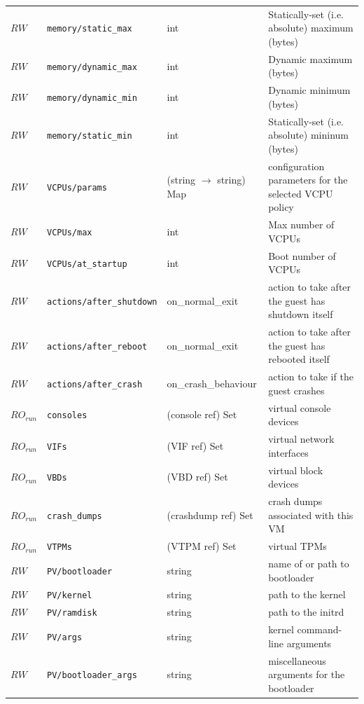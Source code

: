 \begin{longtable}{|lllp{}|}
$\mathit{RW}$ &  {\tt memory/static\_max} & int & Statically-set (i.e. absolute) maximum (bytes) \\
$\mathit{RW}$ &  {\tt memory/dynamic\_max} & int & Dynamic maximum (bytes) \\
$\mathit{RW}$ &  {\tt memory/dynamic\_min} & int & Dynamic minimum (bytes) \\
$\mathit{RW}$ &  {\tt memory/static\_min} & int & Statically-set (i.e. absolute) mininum (bytes) \\
$\mathit{RW}$ &  {\tt VCPUs/params} & (string $\rightarrow$ string) Map & configuration parameters for the selected VCPU policy \\
$\mathit{RW}$ &  {\tt VCPUs/max} & int & Max number of VCPUs \\
$\mathit{RW}$ &  {\tt VCPUs/at\_startup} & int & Boot number of VCPUs \\
$\mathit{RW}$ &  {\tt actions/after\_shutdown} & on\_normal\_exit & action to take after the guest has shutdown itself \\
$\mathit{RW}$ &  {\tt actions/after\_reboot} & on\_normal\_exit & action to take after the guest has rebooted itself \\
$\mathit{RW}$ &  {\tt actions/after\_crash} & on\_crash\_behaviour & action to take if the guest crashes \\
$\mathit{RO}_\mathit{run}$ &  {\tt consoles} & (console ref) Set & virtual console devices \\
$\mathit{RO}_\mathit{run}$ &  {\tt VIFs} & (VIF ref) Set & virtual network interfaces \\
$\mathit{RO}_\mathit{run}$ &  {\tt VBDs} & (VBD ref) Set & virtual block devices \\
$\mathit{RO}_\mathit{run}$ &  {\tt crash\_dumps} & (crashdump ref) Set & crash dumps associated with this VM \\
$\mathit{RO}_\mathit{run}$ &  {\tt VTPMs} & (VTPM ref) Set & virtual TPMs \\
$\mathit{RW}$ &  {\tt PV/bootloader} & string & name of or path to bootloader \\
$\mathit{RW}$ &  {\tt PV/kernel} & string & path to the kernel \\
$\mathit{RW}$ &  {\tt PV/ramdisk} & string & path to the initrd \\
$\mathit{RW}$ &  {\tt PV/args} & string & kernel command-line arguments \\
$\mathit{RW}$ &  {\tt PV/bootloader\_args} & string & miscellaneous arguments for the bootloader \\

\end{longtable}
